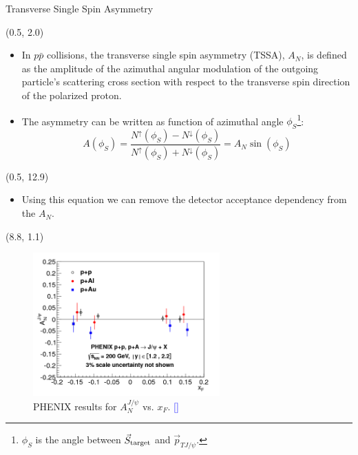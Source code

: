 \documentclass[11pt, xcolor={dvipsnames}, aspectratio = 169]{beamer}
\newcommand{\citeme}[1]{{\tiny \textcolor{blue}{[\fullcite{#1}]}}}
\newcommand{\pp}{$p\bar{p}$ }
\begin{document}
\begin{frame}{Transverse Single Spin Asymmetry}

\begin{textblock}{8.0}(0.5, 2.0)

\begin{itemize}

\item In \pp collisions, the transverse single spin asymmetry (TSSA), $A_{N}$, is defined as the amplitude of the azimuthal angular modulation of the outgoing particle’s scattering cross section with respect to the transverse spin direction of the polarized proton.

\item The asymmetry can be written as function of azimuthal angle $\phi_{S}$\footnote{\tiny {$\phi_{S}$ is the angle between $\vec{S}_{\rm target}$ and $\vec{p}_{TJ/\psi}$}.}:
%
\begin{equation*}
    A(\phi_{S}) = \frac{N^{\uparrow}(\phi_{S}) - N^{\downarrow}(\phi_{S})}{N^{\uparrow}(\phi_{S}) + N^{\downarrow}(\phi_{S})} = A_{N}\sin(\phi_{S})
\end{equation*}
%
%
\end{itemize}
\end{textblock}

\begin{textblock}{15.0}(0.5, 12.9)
\begin{itemize}
\item Using this equation we can remove the detector acceptance dependency from the $A_{N}$.
\end{itemize}
\end{textblock}


\begin{textblock}{7.0}(8.8, 1.1)

\begin{figure}
    \centering
    \includegraphics[height = 5.5cm]{imgs/final_xf.png}
    \caption{PHENIX results for $A^{J/\psi}_{N}$ vs. $x_{F}$. \citeme{PHENIX:2018qvl}}
\end{figure}

\end{textblock}

\end{frame}
\end{document}
